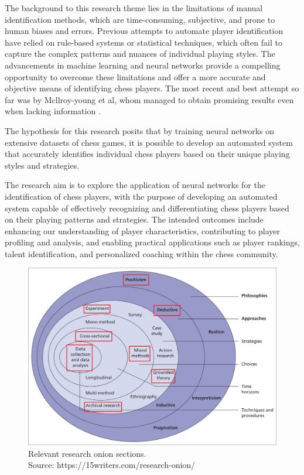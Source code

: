 \begin{spacing}{2.0}
The background to this research theme lies in the limitations of manual identification methods, which are time-consuming, subjective, and prone to human biases and errors. Previous attempts to automate player identification have relied on rule-based systems or statistical techniques, which often fail to capture the complex patterns and nuances of individual playing styles. The advancements in machine learning and neural networks provide a compelling opportunity to overcome these limitations and offer a more accurate and objective means of identifying chess players. The most recent and best attempt so far was by Mcllroy-young et al, whom managed to obtain promising results even when lacking information \cite{stylometryChess}.

The hypothesis for this research posits that by training neural networks on extensive datasets of chess games, it is possible to develop an automated system that accurately identifies individual chess players based on their unique playing styles and strategies.

The research aim is to explore the application of neural networks for the identification of chess players, with the purpose of developing an automated system capable of effectively recognizing and differentiating chess players based on their playing patterns and strategies. The intended outcomes include enhancing our understanding of player characteristics, contributing to player profiling and analysis, and enabling practical applications such as player rankings, talent identification, and personalized coaching within the chess community.

\begin{figure}[ht]
\centering
\includegraphics[scale=0.3]{Figures/Research-Onion.jpg}
\caption{Relevant research onion sections.\\Source: https://15writers.com/research-onion/}
\label{fig:Onion} 
\end{figure}


\end{spacing}
\newpage


